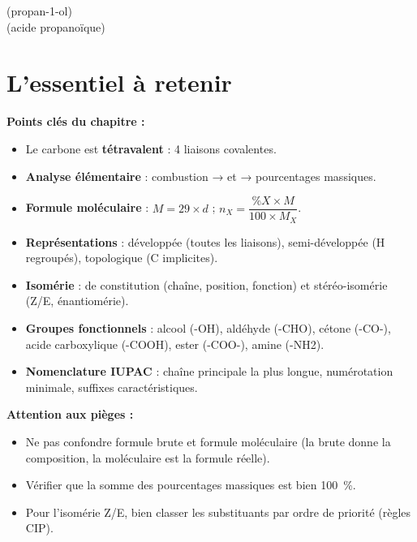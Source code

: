 \begin{exemple}
\begin{center}
\begin{illus}
 \quad (propan-1-ol)\\[4pt]
 \quad (acide propanoïque)
\end{illus}
\end{center}
\end{exemple}

\section{L'essentiel à retenir}

\begin{synthese}
\textbf{Points clés du chapitre :}
\begin{itemize}
    \item Le carbone est \textbf{tétravalent} : 4 liaisons covalentes.
    \item \textbf{Analyse élémentaire} : combustion →  et  → pourcentages massiques.
    \item \textbf{Formule moléculaire} : $M = 29 \times d$ ; $n_X = \dfrac{\%X \times M}{100 \times M_X}$.
    \item \textbf{Représentations} : développée (toutes les liaisons), semi-développée (H regroupés), topologique (C implicites).
    \item \textbf{Isomérie} : de constitution (chaîne, position, fonction) et stéréo-isomérie (Z/E, énantiomérie).
    \item \textbf{Groupes fonctionnels} : alcool (-OH), aldéhyde (-CHO), cétone (-CO-), acide carboxylique (-COOH), ester (-COO-), amine (-NH2).
    \item \textbf{Nomenclature IUPAC} : chaîne principale la plus longue, numérotation minimale, suffixes caractéristiques.
\end{itemize}
\textbf{Attention aux pièges :}
\begin{itemize}
    \item Ne pas confondre formule brute et formule moléculaire (la brute donne la composition, la moléculaire est la formule réelle).
    \item Vérifier que la somme des pourcentages massiques est bien \SI{100}{\%}.
    \item Pour l'isomérie Z/E, bien classer les substituants par ordre de priorité (règles CIP).
\end{itemize}
\end{synthese}

